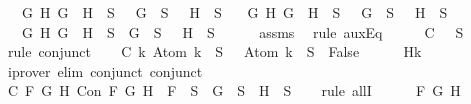 \begin{isabellebody}
\ \ {\isasymand}\ {\isacharparenleft}{\isasymforall}G\ H{\isachardot}\ \isactrlbold {\isasymnot}{\isacharparenleft}G\ \isactrlbold {\isasymand}\ H{\isacharparenright}\ {\isasymin}\ S\ {\isasymlongrightarrow}\ \isactrlbold {\isasymnot}\ G\ {\isasymin}\ S\ {\isasymor}\ \isactrlbold {\isasymnot}\ H\ {\isasymin}\ S{\isacharparenright}\isanewline
\ \ {\isasymand}\ {\isacharparenleft}{\isasymforall}G\ H{\isachardot}\ \isactrlbold {\isasymnot}{\isacharparenleft}G\ \isactrlbold {\isasymor}\ H{\isacharparenright}\ {\isasymin}\ S\ {\isasymlongrightarrow}\ \isactrlbold {\isasymnot}\ G\ {\isasymin}\ S\ {\isasymand}\ \isactrlbold {\isasymnot}\ H\ {\isasymin}\ S{\isacharparenright}\isanewline
\ \ {\isasymand}\ {\isacharparenleft}{\isasymforall}G\ H{\isachardot}\ \isactrlbold {\isasymnot}{\isacharparenleft}G\ \isactrlbold {\isasymrightarrow}\ H{\isacharparenright}\ {\isasymin}\ S\ {\isasymlongrightarrow}\ G\ {\isasymin}\ S\ {\isasymand}\ \isactrlbold {\isasymnot}\ H\ {\isasymin}\ S{\isacharparenright}{\isacharparenright}{\isachardoublequoteclose}\isanewline
\ \ \ \ \isamarkupfalse%
\ assms\ \isamarkupfalse%
\ {\isacharparenleft}rule\ auxEq{\isacharparenright}\isanewline
\ \ \isamarkupfalse%
\ \isamarkupfalse%
\ C{}{\isacharcolon}\ {\isachardoublequoteopen}{\isasymbottom}\ {\isasymnotin}\ S{\isachardoublequoteclose}\isanewline
\ \ \ \ \isamarkupfalse%
\ {\isacharparenleft}rule\ conjunct{}{\isacharparenright}\isanewline
\ \ \isamarkupfalse%
\ C{}{\isacharcolon}\ {\isachardoublequoteopen}{\isasymforall}k{\isachardot}\ Atom\ k\ {\isasymin}\ S\ {\isasymlongrightarrow}\ \isactrlbold {\isasymnot}\ {\isacharparenleft}Atom\ k{\isacharparenright}\ {\isasymin}\ S\ {\isasymlongrightarrow}\ False{\isachardoublequoteclose}\isanewline
\ \ \ \ \isamarkupfalse%
\ Hk\ \isamarkupfalse%
\ {\isacharparenleft}iprover\ elim{\isacharcolon}\ conjunct{}\ conjunct{}{\isacharparenright}\isanewline
\ \ \isamarkupfalse%
\ C{}{\isacharcolon}\ {\isachardoublequoteopen}{\isasymforall}F\ G\ H{\isachardot}\ Con\ F\ G\ H\ {\isasymlongrightarrow}\ F\ {\isasymin}\ S\ {\isasymlongrightarrow}\ G\ {\isasymin}\ S\ {\isasymand}\ H\ {\isasymin}\ S{\isachardoublequoteclose}\isanewline
\ \ \isamarkupfalse%
\ {\isacharparenleft}rule\ allI{\isacharparenright}{\isacharplus}\isanewline
\ \ \ \ \isamarkupfalse%
\ F\ G\ H\isanewline
\ \ \ \ \isamarkupfalse%

\end{isabellebody}
